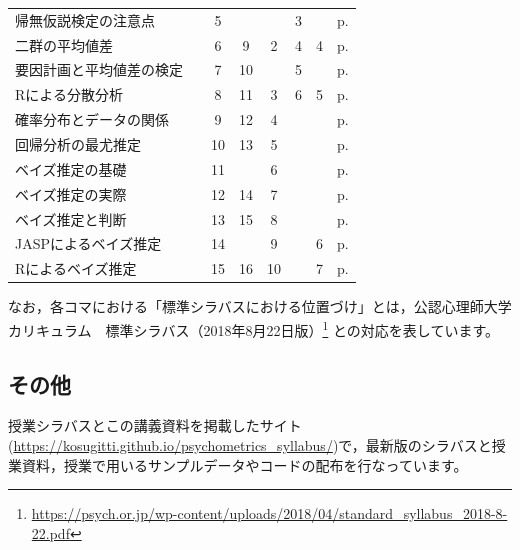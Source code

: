 \begin{table}
\begin{tabular}[t]{lccccccc}
		帰無仮説検定の注意点   &      & 5  &     &       & 3  &    & p.\pageref{m19_NHST2}                \\
		二群の平均値差      &      & 6  & 9   & 2     & 4  & 4  & p.\pageref{m20_ttest}                \\
		要因計画と平均値差の検定 &      & 7  & 10  &       & 5  &    & p.\pageref{m21_anova}                \\
		Rによる分散分析     &      & 8  & 11  & 3     & 6  & 5  & p.\pageref{m22_anovaOnR}             \\
		確率分布とデータの関係  &      & 9  & 12  & 4     &    &    & p.\pageref{m23_likelihood}           \\
		回帰分析の最尤推定    &      & 10 & 13  & 5     &    &    & p.\pageref{m24_maximum_likelihood}   \\
		ベイズ推定の基礎     &      & 11 &     & 6     &    &    & p.\pageref{m25_bayesian}             \\
		ベイズ推定の実際     &      & 12 & 14  & 7     &    &    & p.\pageref{m26_bayesian2}            \\
		ベイズ推定と判断     &      & 13 & 15  & 8     &    &    & p.\pageref{m27_bayesian3}            \\
		JASPによるベイズ推定 &      & 14 &     & 9     &    & 6  & p.\pageref{m28_jasp}                 \\
		Rによるベイズ推定    &      & 15 & 16  & 10    &    & 7  & p.\pageref{m29_brms}                 \\\hline
	\end{tabular}
\end{table}


なお，各コマにおける「標準シラバスにおける位置づけ」とは，公認心理師大学カリキュラム　標準シラバス（2018年8月22日版）\footnote{\url{https://psych.or.jp/wp-content/uploads/2018/04/standard_syllabus_2018-8-22.pdf}} との対応を表しています。

\subsection*{その他}
授業シラバスとこの講義資料を掲載したサイト(\url{https://kosugitti.github.io/psychometrics_syllabus/})で，最新版のシラバスと授業資料，授業で用いるサンプルデータやコードの配布を行なっています。

